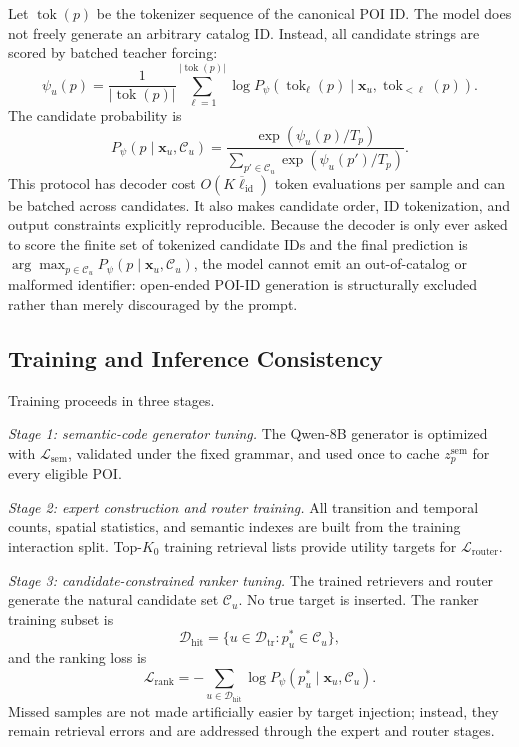 \documentclass[journal]{IEEEtran}
\newcommand{\Train}{\mathcal{D}_{\mathrm{tr}}}
\newcommand{\HitTrain}{\mathcal{D}_{\mathrm{hit}}}
\begin{document}
Let $\operatorname{tok}(p)$ be the tokenizer sequence of the canonical POI ID.
The model does not freely generate an arbitrary catalog ID.
Instead, all candidate strings are scored by batched teacher forcing:
\begin{equation}
\psi_u(p)
=
\frac{1}{|\operatorname{tok}(p)|}
\sum_{\ell=1}^{|\operatorname{tok}(p)|}
\log
P_{\psi}
\left(
\operatorname{tok}_{\ell}(p)
\mid
\bm{x}_u,
\operatorname{tok}_{<\ell}(p)
\right).
\label{eq:candidate_likelihood}
\end{equation}
The candidate probability is
\begin{equation}
P_{\psi}(p\mid\bm{x}_u,\mathcal{C}_u)
=
\frac{\exp(\psi_u(p)/T_p)}
{\sum_{p'\in\mathcal{C}_u}\exp(\psi_u(p')/T_p)}.
\label{eq:candidate_probability}
\end{equation}
This protocol has decoder cost
$O(K\overline{\ell}_{\mathrm{id}})$ token evaluations per sample and can be
batched across candidates.
It also makes candidate order, ID tokenization, and output constraints
explicitly reproducible. Because the decoder is only ever asked to score the
finite set of tokenized candidate IDs and the final prediction is
$\arg\max_{p\in\mathcal{C}_u}P_{\psi}(p\mid\bm{x}_u,\mathcal{C}_u)$, the model
cannot emit an out-of-catalog or malformed identifier: open-ended POI-ID
generation is structurally excluded rather than merely discouraged by the
prompt.

\subsection{Training and Inference Consistency}
\label{subsec:training}

Training proceeds in three stages.

\textit{Stage 1: semantic-code generator tuning.}
The Qwen-8B generator is optimized with
$\mathcal{L}_{\mathrm{sem}}$, validated under the fixed grammar, and used once
to cache $z_p^{\mathrm{sem}}$ for every eligible POI.

\textit{Stage 2: expert construction and router training.}
All transition and temporal counts, spatial statistics, and semantic indexes
are built from the training interaction split.
Top-$K_0$ training retrieval lists provide utility targets for
$\mathcal{L}_{\mathrm{router}}$.

\textit{Stage 3: candidate-constrained ranker tuning.}
The trained retrievers and router generate the natural candidate set
$\mathcal{C}_u$.
No true target is inserted.
The ranker training subset is
\begin{equation}
\HitTrain
=
\{u\in\Train:p_u^{*}\in\mathcal{C}_u\},
\label{eq:hit_training_set}
\end{equation}
and the ranking loss is
\begin{equation}
\mathcal{L}_{\mathrm{rank}}
=
-
\sum_{u\in\HitTrain}
\log
P_{\psi}(p_u^{*}\mid\bm{x}_u,\mathcal{C}_u).
\label{eq:rank_loss}
\end{equation}
Missed samples are not made artificially easier by target injection; instead,
they remain retrieval errors and are addressed through the expert and router
stages.
\end{document}
